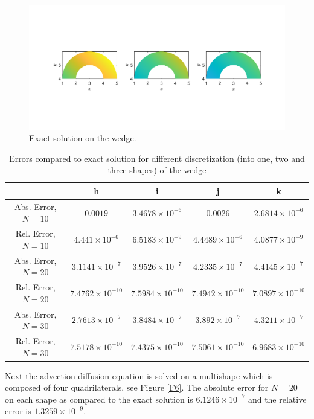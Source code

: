 \documentclass[11pt, a4paper]{article}
\theoremstyle{definition}
\begin{document}
\begin{figure}[h]
	\centering
	\includegraphics[scale=0.35]{wedgeEx.png}
	\caption{Exact solution on the wedge.} 
	\label{F5}
\end{figure}
\begin{table}
	\caption{Errors compared to exact solution for different discretization (into one, two and three shapes) of the wedge}
	\begin{tabular}{ ||c| c| c| c| c|| }
		\hline
		\hline
		& h & i & j& k\\ 
		\hline
		Abs. Error, $N =10$& $0.0019$ & $3.4678 \times 10^{-6}$ & $0.0026$ & $2.6814\times 10^{-6}$\\  
		Rel. Error, $N =10$& $4.441 \times 10^{-6}$& $6.5183 \times 10^{-9}$ &$4.4489 \times 10^{-6}$ &  $4.0877\times 10^{-9}$\\
		\hline
		Abs. Error, $N =20$& $3.1141 \times 10^{-7}$ & $3.9526 \times 10^{-7}$ & $4.2335\times 10^{-7}$ & $4.4145\times 10^{-7}$\\  
		Rel. Error, $N =20$& $7.4762 \times 10^{-10}$& $7.5984 \times 10^{-10}$ &$7.4942 \times 10^{-10}$ &  $7.0897 \times 10^{-10}$\\
		\hline
		Abs. Error, $N =30$& $ 2.7613\times 10^{-7}$ & $ 3.8484\times 10^{-7}$ & $3.892\times 10^{-7}$ & $4.3211\times 10^{-7}$ \\  
		Rel. Error, $N =30$ & $ 7.5178\times 10^{-10}$& $ 7.4375\times 10^{-10}$ &$7.5061\times 10^{-10}$ & $6.9683\times 10^{-10}$  \\
		\hline
		\hline
	\end{tabular}
	\label{Tab2:ErrorsExWedge}
\end{table}
Next the advection diffusion equation is solved on a multishape which is composed of four quadrilaterals, see Figure \ref{F6}. The absolute error for $N = 20$ on each shape as compared to the exact solution is $6.1246 \times 10^{-7}$ and the relative error is $1.3259 \times 10^{-9}$. 
\end{document}
